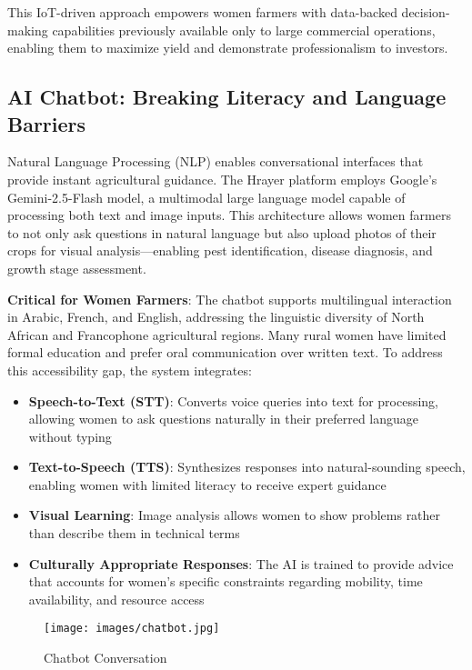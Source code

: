 \documentclass[9pt,twocolumn,twoside]{article}
\begin{document}
This IoT-driven approach empowers women farmers with data-backed decision-making capabilities previously available only to large commercial operations, enabling them to maximize yield and demonstrate professionalism to investors.

\subsection{AI Chatbot: Breaking Literacy and Language Barriers}

Natural Language Processing (NLP) enables conversational interfaces that provide instant agricultural guidance. The Hrayer platform employs Google's Gemini-2.5-Flash model, a multimodal large language model capable of processing both text and image inputs. This architecture allows women farmers to not only ask questions in natural language but also upload photos of their crops for visual analysis—enabling pest identification, disease diagnosis, and growth stage assessment.

\textbf{Critical for Women Farmers}: The chatbot supports multilingual interaction in Arabic, French, and English, addressing the linguistic diversity of North African and Francophone agricultural regions. Many rural women have limited formal education and prefer oral communication over written text. To address this accessibility gap, the system integrates:

\begin{itemize}
\item \textbf{Speech-to-Text (STT)}: Converts voice queries into text for processing, allowing women to ask questions naturally in their preferred language without typing
\item \textbf{Text-to-Speech (TTS)}: Synthesizes responses into natural-sounding speech, enabling women with limited literacy to receive expert guidance
\item \textbf{Visual Learning}: Image analysis allows women to show problems rather than describe them in technical terms
\item \textbf{Culturally Appropriate Responses}: The AI is trained to provide advice that accounts for women's specific constraints regarding mobility, time availability, and resource access
\end{itemize}


\begin{figure}[H]
\centering
\texttt{[image: images/chatbot.jpg]}
\caption{Chatbot Conversation}
\label{fig:architecture}
\end{figure}
\end{document}
